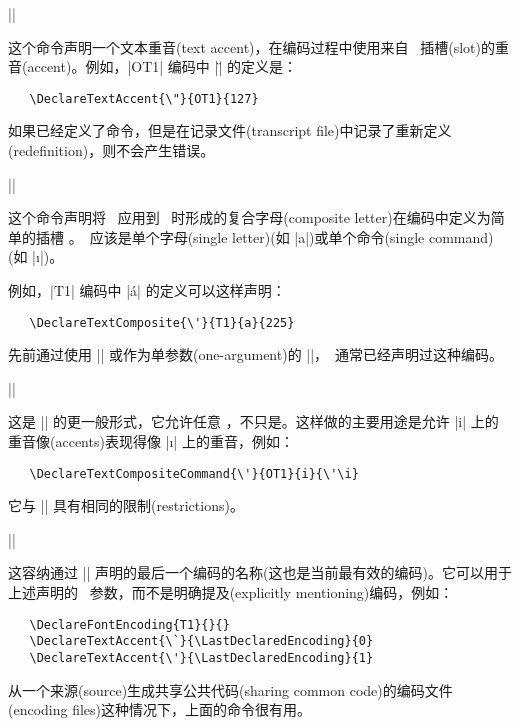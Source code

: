 \documentclass{ltxguide}[1995/11/28]
\begin{document}
\begin{decl}
  |\DeclareTextAccent|   
\end{decl}
这个命令声明一个文本重音(text accent)，在编码过程中使用来自 \ 插槽(slot)的重音(accent)。例如，|OT1| 编码中 |\"| 的定义是：
\begin{verbatim}
   \DeclareTextAccent{\"}{OT1}{127}
\end{verbatim}
如果已经定义了命令，但是在记录文件(transcript file)中记录了重新定义(redefinition)，则不会产生错误。

\begin{decl}
  |\DeclareTextComposite|   
\end{decl}
这个命令声明将 \ 应用到 \ 时形成的复合字母(composite letter)在编码中定义为简单的插槽 。\ 应该是单个字母(single letter)(如 |a|)或单个命令(single command)(如 |\i|)。

例如，|T1| 编码中 |\'{a}| 的定义可以这样声明：
\begin{verbatim}
   \DeclareTextComposite{\'}{T1}{a}{225}
\end{verbatim}

先前通过使用 |\DeclareTextAccent| 或作为单参数(one-argument)的 |\DeclareTextCommand|，\ 通常已经声明过这种编码。

\begin{decl}[1994/12/01]
  |\DeclareTextCompositeCommand|   
\end{decl}
这是 |\DeclareTextComposite| 的更一般形式，它允许任意 ，不只是。这样做的主要用途是允许 |i| 上的重音像(accents)表现得像 |\i| 上的重音，例如：
\begin{verbatim}
   \DeclareTextCompositeCommand{\'}{OT1}{i}{\'\i}
\end{verbatim}
它与 |\DeclareTextComposite| 具有相同的限制(restrictions)。


\begin{decl}[1998/12/01]
  |\LastDeclaredEncoding|
\end{decl}
这容纳通过 |\DeclareFontEncoding| 声明的最后一个编码的名称(这也是当前最有效的编码)。它可以用于上述声明的 \ 参数，而不是明确提及(explicitly mentioning)编码，例如：
\begin{verbatim}
   \DeclareFontEncoding{T1}{}{}
   \DeclareTextAccent{\`}{\LastDeclaredEncoding}{0}
   \DeclareTextAccent{\'}{\LastDeclaredEncoding}{1}
\end{verbatim}
从一个来源(source)生成共享公共代码(sharing common code)的编码文件(encoding files)这种情况下，上面的命令很有用。
\end{document}

